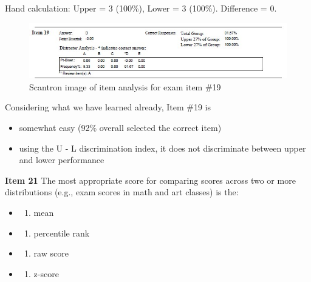\documentclass[
  english,
]{book}
\providecommand{\tightlist}{%
  \setlength{\itemsep}{0pt}\setlength{\parskip}{0pt}}
\begin{document}
Hand calculation: Upper = 3 (100\%), Lower = 3 (100\%). Difference = 0.

\begin{figure}
\centering
\includegraphics{images/ItemAnalExam/Item19.jpg}
\caption{Scantron image of item analysis for exam item \#19}
\end{figure}

Considering what we have learned already, Item \#19 is

\begin{itemize}
\tightlist
\item
  somewhat easy (92\% overall selected the correct item)
\item
  using the U - L discrimination index, it does not discriminate between upper and lower performance
\end{itemize}

\textbf{Item 21} The most appropriate score for comparing scores across two or more distributions (e.g., exam scores in math and art classes) is the:

\begin{itemize}
\item
  \begin{enumerate}
  \def\labelenumi{\alph{enumi})}
  \tightlist
  \item
    mean
  \end{enumerate}
\item
  \begin{enumerate}
  \def\labelenumi{\alph{enumi})}
  \setcounter{enumi}{1}
  \tightlist
  \item
    percentile rank
  \end{enumerate}
\item
  \begin{enumerate}
  \def\labelenumi{\alph{enumi})}
  \setcounter{enumi}{2}
  \tightlist
  \item
    raw score
  \end{enumerate}
\item
  \begin{enumerate}
  \def\labelenumi{\alph{enumi})}
  \setcounter{enumi}{3}
  \tightlist
  \item
    z-score
  \end{enumerate}
\end{itemize}
\end{document}
